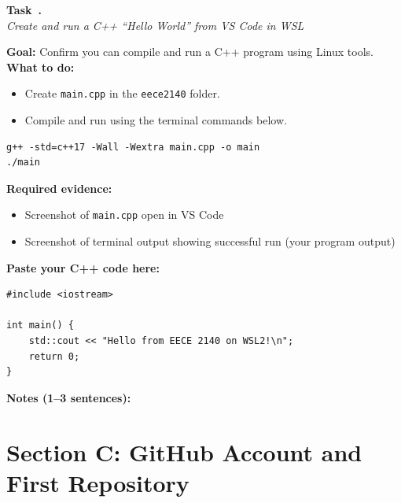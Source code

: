 \documentclass[11pt]{article}
\newcounter{task}
\newenvironment{task}[1][]{%
  \refstepcounter{task}%
  \par\vspace{0.75em}
  {\large\bfseries Task~\thetask.}\ \\[-0.25em]
  \textit{#1}\par\vspace{0.25em}
}{\vspace{0.75em}}
\begin{document}
\begin{task}[Create and run a C++ ``Hello World'' from VS Code in WSL]
\begin{checkbox}
\textbf{Goal:} Confirm you can compile and run a C++ program using Linux tools.\\
\textbf{What to do:}
\begin{itemize}[leftmargin=1.5em]
  \item Create \texttt{main.cpp} in the \texttt{eece2140} folder.
  \item Compile and run using the terminal commands below.
\end{itemize}
\end{checkbox}

\begin{lstlisting}[style=term,caption={Compile and run (WSL terminal inside VS Code)}]
g++ -std=c++17 -Wall -Wextra main.cpp -o main
./main
\end{lstlisting}

\noindent\textbf{Required evidence:}
\begin{itemize}[leftmargin=1.5em]
  \item Screenshot of \texttt{main.cpp} open in VS Code
  \item Screenshot of terminal output showing successful run (your program output)
\end{itemize}

\noindent\textbf{Paste your C++ code here:}
\begin{lstlisting}[style=term,caption={main.cpp}]
#include <iostream>

int main() {
    std::cout << "Hello from EECE 2140 on WSL2!\n";
    return 0;
}
\end{lstlisting}

\noindent\textbf{Notes (1--3 sentences):}
\end{task}

\section*{Section C: GitHub Account and First Repository}
\end{document}

